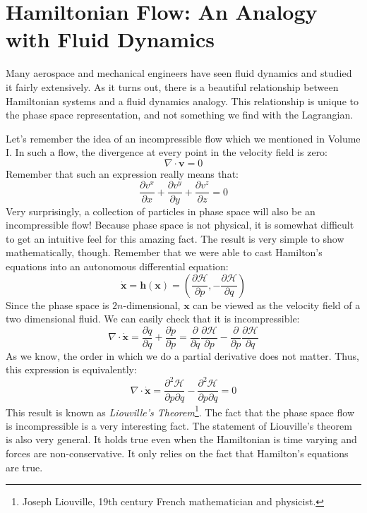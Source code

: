 \section{Hamiltonian Flow: An Analogy with Fluid Dynamics}
Many aerospace and mechanical engineers have seen fluid dynamics and studied it fairly extensively. As it turns out, there is a beautiful relationship between \gls{Hamiltonian} systems and a fluid dynamics analogy. This relationship is unique to the phase space representation, and not something we find with the \gls{Lagrangian}.

Let's remember the idea of an incompressible flow which we mentioned in Volume I. In such a flow, the divergence at every point in the velocity field is zero:
$$\nabla\cdot\bm{v}=0$$
Remember that such an expression really means that:
$$\frac{\partial v^x}{\partial x}+\frac{\partial v^y}{\partial y}+\frac{\partial v^z}{\partial z}=0$$
Very surprisingly, a collection of particles in phase space will also be an incompressible flow! Because phase space is not physical, it is somewhat difficult to get an intuitive feel for this amazing fact. The result is very simple to show mathematically, though. Remember that we were able to cast Hamilton's equations into an autonomous differential equation:
$$\bm{\dot{x}}=\bm{h}(\bm{x})=\left(\frac{\partial\mathcal{H}}{\partial p},-\frac{\partial\mathcal{H}}{\partial q}\right)$$
Since the phase space is $2n$-dimensional, $\bm{x}$ can be viewed as the velocity field of a two dimensional fluid. We can easily check that it is incompressible:
$$\nabla\cdot\bm{\dot{x}}=\frac{\partial \dot{q}}{\partial q}+\frac{\partial \dot{p}}{\partial p}=\frac{\partial}{\partial q}\frac{\partial\mathcal{H}}{\partial p}-\frac{\partial}{\partial p}\frac{\partial\mathcal{H}}{\partial q}$$
As we know, the order in which we do a partial derivative does not matter. Thus, this expression is equivalently:
$$\nabla\cdot\bm{\dot{x}}=\frac{\partial^2\mathcal{H}}{\partial p\partial q}-\frac{\partial^2\mathcal{H}}{\partial p\partial q}=0$$
This result is known as \textit{Liouville's Theorem}\footnote{Joseph Liouville, 19th century French mathematician and physicist.}. The fact that the phase space flow is incompressible is a very interesting fact. The statement of Liouville's theorem is also very general. It holds true even when the Hamiltonian is time varying and forces are non-conservative. It only relies on the fact that Hamilton's equations are true. 

